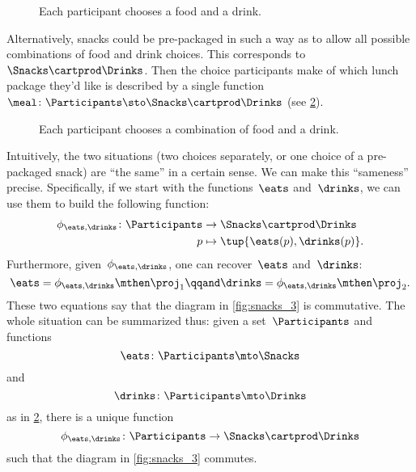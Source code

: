 \begin{figure}[h!]
	\centering
	\caption{Each participant chooses a food and a drink.}
	\label{fig:snacks_1}
\end{figure}

Alternatively, snacks could be pre-packaged in such a way as to allow all possible combinations of food and drink choices.
This corresponds to~$\Snacks\cartprod \Drinks$.
Then the choice participants make of which lunch package they'd like is described by a single function~$\meal \colon \Participants\sto \Snacks\cartprod \Drinks$ (see \cref{fig:snacks_2}).

\begin{figure}[h!]
	\centering
	\caption{Each participant chooses a combination of food and a drink. \label{fig:snacks_2}}
\end{figure}

Intuitively, the two situations (two choices separately, or one choice of a pre-packaged snack) are ``the same'' in a certain sense.
We can make this ``sameness'' precise.
Specifically, if we start with the functions~$\eats$ and~$\drinks$, we can use them to build the following function:
\begin{equation}
	\label{eq:snacks-building-univ-map}
	\begin{aligned}
		\phi_{\eats,\drinks}\colon \Participants & \to \Snacks\cartprod \Drinks       \\
		p                                        & \mapsto \tup{\eats(p),\drinks(p)}.
	\end{aligned}
\end{equation}
Furthermore, given~$\phi_{\eats,\drinks}$, one can recover~$\eats$ and~$\drinks$:
\begin{equation}
	\label{eq:snacks-proj-univ-map}
	\eats =\phi_{\eats,\drinks}\mthen \proj_1 \qqand \drinks=\phi_{\eats,\drinks}\mthen \proj_2.
\end{equation}
These two equations say that the diagram in \cref{fig:snacks_3} is commutative.
The whole situation can be summarized thus: given a set~$\Participants$ and functions
\begin{equation}
	\eats\colon \Participants \mto \Snacks
\end{equation}
and
\begin{equation}
	\drinks\colon \Participants \mto \Drinks
\end{equation}
as in \cref{fig:snacks_2}, there is a unique function
\begin{equation}
	\label{eq:snacks-unique-univ-map}
	\phi_{\eats,\drinks} \colon \Participants \to \Snacks \cartprod \Drinks
\end{equation}
such that the diagram in \cref{fig:snacks_3} commutes.

